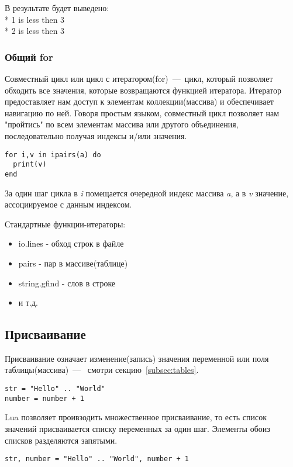 В результате будет выведено: 
\\* 1 is less then 3
\\* 2 is less then 3

\subsubsection{Общий for}

Совместный цикл или цикл с итератором(for)~---~цикл, который позволяет обходить все значения, которые возвращаются функцией итератора. Итератор предоставляет нам доступ к элементам коллекции(массива) и обеспечивает навигацию по ней. Говоря простым языком, совместный цикл позволяет нам "пройтись" по всем элементам массива или другого объединения, последовательно получая индексы и/или значения. 

\begin{lstlisting}
for i,v in ipairs(a) do 
  print(v) 
end
\end{lstlisting}

За один шаг цикла в \emph{i} помещается очередной индекс массива \emph{a}, а в \emph{v} значение, ассоциируемое с данным индексом. 

Стандартные функции-итераторы:
\begin{itemize}
	\item io.lines - обход строк в файле
	\item pairs - пар в массиве(таблице)
	\item string.gfind - слов в строке 
	\item и т.д.
\end{itemize}

  
\subsection{Присваивание}

Присваивание означает изменение(запись) значения переменной или поля таблицы(массива)~---~ смотри секцию~\ref{subsec:tables}.

\begin{lstlisting}
str = "Hello" .. "World"
number = number + 1
\end{lstlisting}

Lua позволяет проивзодить множественное присваивание, то есть список значений присваивается списку переменных за один шаг. Элементы обоиз списков разделяются запятыми. 

\begin{lstlisting}
str, number = "Hello" .. "World", number + 1
\end{lstlisting}

